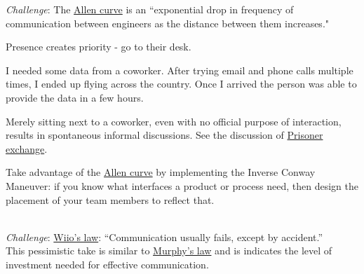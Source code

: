 \textit{Challenge}: The \href{https://en.wikipedia.org/wiki/Allen_curve}{Allen curve} 
is 
an ``exponential drop in frequency of communication between engineers as the distance between them increases."

Presence creates priority - go to their desk. 
\begin{mdframed}[frametitle={Presence Creates Priority},frametitlerule=true,frametitlealignment=\centering]
I needed some data from a coworker. After trying email and phone calls multiple times, I ended up flying across the country. Once I arrived the person was able to provide the data in a few hours.
\end{mdframed}

Merely sitting next to a coworker, even with no official purpose of interaction, results in spontaneous informal discussions. See the discussion of 
\hyperref[sec:prisoner-exchange]{Prisoner exchange}.

Take advantage of the \href{https://en.wikipedia.org/wiki/Allen_curve}{Allen curve} 
by implementing the Inverse Conway Maneuver: if you know what interfaces a product or process need, then design the placement of your team members to reflect that.

\ \\
\textit{Challenge}: \href{https://en.wikipedia.org/wiki/Wiio\%27s_laws}{Wiio's law}: 
``Communication usually fails, except by accident.''\\
This pessimistic take is similar to \href{https://en.wikipedia.org/wiki/Murphy\%27s_law}{Murphy's law}
and is indicates the level of investment needed for effective communication. 

